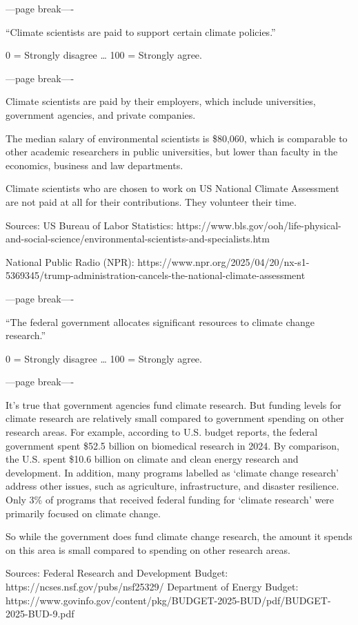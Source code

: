 \documentclass[
  letterpaper,
  DIV=11,
  numbers=noendperiod]{scrartcl}
\begin{document}
---page break----

``Climate scientists are paid to support certain climate policies.''

0 = Strongly disagree \ldots{} 100 = Strongly agree.

---page break----

Climate scientists are paid by their employers, which include
universities, government agencies, and private companies.

The median salary of environmental scientists is \$80,060, which is
comparable to other academic researchers in public universities, but
lower than faculty in the economics, business and law departments.

Climate scientists who are chosen to work on US National Climate
Assessment are not paid at all for their contributions. They volunteer
their time.

Sources: US Bureau of Labor Statistics:
https://www.bls.gov/ooh/life-physical-and-social-science/environmental-scientists-and-specialists.htm

National Public Radio (NPR):
https://www.npr.org/2025/04/20/nx-s1-5369345/trump-administration-cancels-the-national-climate-assessment

---page break----

``The federal government allocates significant resources to climate
change research.''

0 = Strongly disagree \ldots{} 100 = Strongly agree.

---page break----

It's true that government agencies fund climate research. But funding
levels for climate research are relatively small compared to government
spending on other research areas. For example, according to U.S. budget
reports, the federal government spent \$52.5 billion on biomedical
research in 2024. By comparison, the U.S. spent \$10.6 billion on
climate and clean energy research and development. In addition, many
programs labelled as `climate change research' address other issues,
such as agriculture, infrastructure, and disaster resilience. Only 3\%
of programs that received federal funding for `climate research' were
primarily focused on climate change.

So while the government does fund climate change research, the amount it
spends on this area is small compared to spending on other research
areas.

Sources: Federal Research and Development Budget:
https://ncses.nsf.gov/pubs/nsf25329/ Department of Energy Budget:
https://www.govinfo.gov/content/pkg/BUDGET-2025-BUD/pdf/BUDGET-2025-BUD-9.pdf
\end{document}
